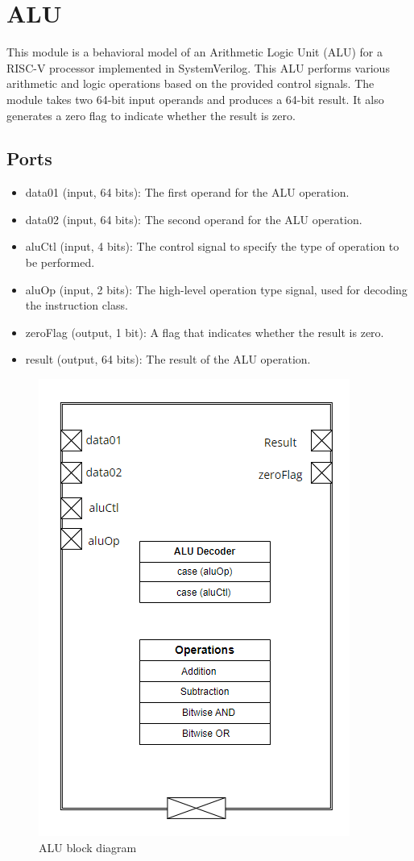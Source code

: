 \newpage
\section{ALU}

This module is a behavioral model of an Arithmetic Logic Unit (ALU) for a RISC-V  processor implemented in SystemVerilog. This ALU performs various arithmetic and logic operations based on the provided control signals. The module takes two 64-bit input operands and produces a 64-bit result. It also generates a zero flag to indicate whether the result is zero.

\subsection{Ports}

\begin{itemize}
    \item data01 (input, 64 bits): The first operand for the ALU operation.
    \item data02 (input, 64 bits): The second operand for the ALU operation.
    \item aluCtl (input, 4 bits): The control signal to specify the type of operation to be performed.
    \item aluOp (input, 2 bits): The high-level operation type signal, used for decoding the instruction class.
    \item zeroFlag (output, 1 bit): A flag that indicates whether the result is zero.
    \item result (output, 64 bits): The result of the ALU operation.
\end{itemize}



\begin{figure}[H]
    \centering
    \includegraphics[width=0.4\linewidth]{Image/Block Diagram.png}
    \caption{ALU block diagram}
    \label{fig:ALU block diagram}
\end{figure}

